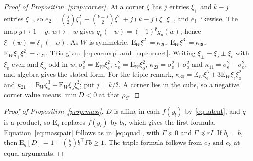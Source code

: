 \documentclass[10pt,a4paper]{article}
\newcommand{\rs}{\rho_S}
\newcommand{\Eq}{\mathrm{E}_q}
\newcommand{\EW}{\mathrm{E}_W}
\newcommand{\se}{\sigma_{\mathrm{e}}}
\newcommand{\so}{\sigma_{\mathrm{o}}}
\newcommand{\xe}{\xi_{\mathrm{e}}}
\newcommand{\xo}{\xi_{\mathrm{o}}}
\theoremstyle{upright}
\begin{document}
\begin{proof}[Proof of Proposition~\ref{prop:corner}]
At a corner $\xi$ has $j$ entries $\xi_+$ and $k-j$ entries $\xi_-$, so $e_2=\binom j2\xi_+^2+\binom{k-j}2\xi_-^2+j(k-j)\xi_+\xi_-$, and $e_3$ likewise. The map $y\mapsto1-y$, $w\mapsto-w$ gives $g_p(-w)=(-1)^pg_p(w)$, hence $\xi_-(w)=\xi_+(-w)$. As $W$ is symmetric, $\EW\xi_-^2=\kappa_{20}$, $\EW\xi_-^3=\kappa_{30}$, $\EW\xi_+\xi_-^2=\kappa_{21}$. This gives~\eqref{eq:cornerp} and~\eqref{eq:cornert}. Writing $\xi_\pm=\xe\pm\xo$ with $\xe$ even and $\xo$ odd in $w$, $\se^2=\EW\xe^2$, $\so^2=\EW\xo^2$, $\kappa_{20}=\se^2+\so^2$ and $\kappa_{11}=\se^2-\so^2$, and algebra gives the stated form. For the triple remark, $\kappa_{30}=\EW\xe^3+3\EW\xe\xo^2$ and $\kappa_{21}=\EW\xe^3-\EW\xe\xo^2$; put $j=k/2$. A corner lies in the cube, so a negative corner value means $\min D<0$ at that $\rs$.
\end{proof}

\begin{proof}[Proof of Proposition~\ref{prop:mass}]
$D$ is affine in each $f(y_l)$ by~\eqref{eq:latent}, and $q$ is a product, so $\Eq$ replaces $f(y_l)$ by $b_l$, which gives the first formula. Equation~\eqref{eq:masspair} follows as in~\eqref{eq:quad}, with $\Gamma\succeq0$ and $\Gamma\preceq rI$. If $b_l=b$, then $\Eq[D]=1+\binom k2b^\top \Gamma b\geq1$. The triple formula follows from $e_2$ and $e_3$ at equal arguments.
\end{proof}
\end{document}
